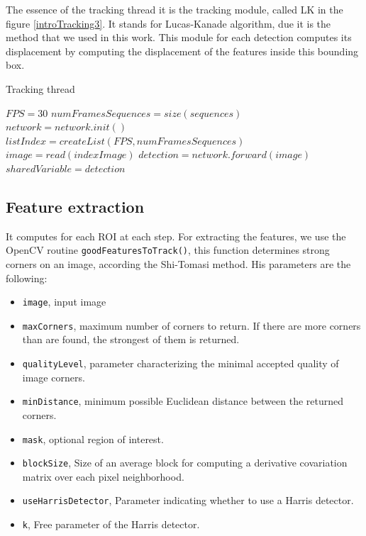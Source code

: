 The essence of the tracking thread it is the tracking module, called LK in the figure \ref{introTracking3}. It stands for Lucas-Kanade algorithm, due it is the method that we used in this work. This module for each detection computes its displacement by computing the displacement of the features inside this bounding box. 



\begin{algorithm}
\caption{Tracking thread}\label{euclid}
\begin{algorithmic}[1]

\State $FPS = 30$
\State $numFramesSequences = size(sequences)$
\State $network = network.init()$
\State $listIndex = createList(FPS,numFramesSequences)$
\State $image = read(indexImage)$
\State $detection = network.forward(image)$
\State $sharedVariable = detection$
\EndFor
\EndProcedure
\end{algorithmic}
\end{algorithm}


\subsection{Feature extraction}

It computes for each ROI at each step. For extracting the features, we use the OpenCV routine \texttt{goodFeaturesToTrack()}, this function determines strong corners on an image, according the Shi-Tomasi method. His parameters are the following:
 
\begin{itemize}

\item \texttt{image}, input image

\item \texttt{maxCorners}, maximum number of corners to return. If there are more corners than are found, the strongest of them is returned.
\item \texttt{qualityLevel}, parameter characterizing the minimal accepted quality of image corners.
\item \texttt{minDistance}, minimum possible Euclidean distance between the returned corners.
\item \texttt{mask}, optional region of interest.
\item \texttt{blockSize}, Size of an average block for computing a derivative covariation matrix over each pixel neighborhood.
\item \texttt{useHarrisDetector},  Parameter indicating whether to use a Harris detector.
\item \texttt{k},  Free parameter of the Harris detector.

\end{itemize}

